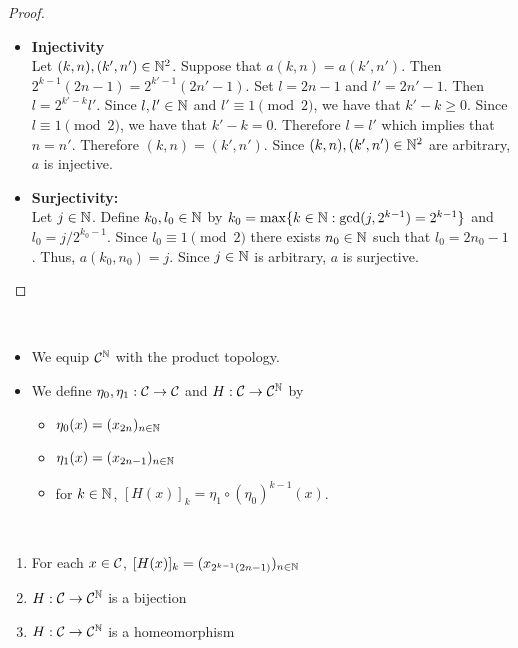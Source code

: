 \documentclass{book}
\begin{document}
	\begin{proof}\
		\begin{itemize}
			\item \textbf{Injectivity} \\ 
			Let $(k,n), (k', n') \in \mathbb{N}^2$. Suppose that $a(k,n) = a(k',n')$. Then $2^{k-1}(2n-1) = 2^{k'-1}(2n'-1)$. Set $l = 2n-1$ and $l' = 2n'-1$. Then $l = 2^{k'-k}l'$. Since $l,l' \in \mathbb{N}$ and $l' \equiv 1 \pmod{2}$, we have that $k'-k \geq 0$. Since $l \equiv 1 \pmod{2}$, we have that $k'-k = 0$. Therefore $l = l'$ which implies that $n = n'$. Therefore $(k,n) = (k', n')$. Since  $(k,n), (k', n') \in \mathbb{N}^2$ are arbitrary, $a$ is injective.
			\item \textbf{Surjectivity:} \\
			Let $j \in \mathbb{N}$. Define $k_0,l_0 \in \mathbb{N}$ by $k_0 = \max \{k \in \mathbb{N}: \gcd(j, 2^{k-1}) = 2^{k-1}\}$ and $l_0 = j/2^{k_0-1}$. Since $l_0 \equiv 1 \pmod{2}$ there exists $n_0 \in \mathbb{N}$ such that $l_0 = 2n_0-1$. Thus, $a(k_0, n_0) = j$. Since $j \in \mathbb{N}$ is arbitrary, $a$ is surjective.
		\end{itemize}
	\end{proof}
	
	\begin{defn}  \
		\begin{itemize}
			\item We equip $\mathcal{C}^{\mathbb{N}}$ with the product topology.
			\item We define $\eta_0, \eta_1: \mathcal{C} \rightarrow \mathcal{C}$ and $H: \mathcal{C} \rightarrow \mathcal{C}^{\mathbb{N}}$ by
			\begin{itemize}
				\item  $\eta_0(x) = (x_{2n})_{n \in \mathbb{N}}$
				\item $\eta_1(x) = (x_{2n-1})_{n \in \mathbb{N}}$ 
				\item for $k \in \mathbb{N}$, $[H(x)]_k = \eta_1 \circ (\eta_0)^{k-1}(x)$. 
			\end{itemize}
		\end{itemize}
	\end{defn}
	
	\begin{ex}  \
		\begin{enumerate}
			\item For each $x \in \mathcal{C}$, $[H(x)]_k = (x_{2^{k-1}(2n-1)})_{n \in \mathbb{N}}$
			\item $H: \mathcal{C} \rightarrow \mathcal{C}^{\mathbb{N}}$ is a bijection
			\item $H: \mathcal{C} \rightarrow \mathcal{C}^{\mathbb{N}}$ is a homeomorphism
		\end{enumerate}
	\end{ex}
	
\end{document}
